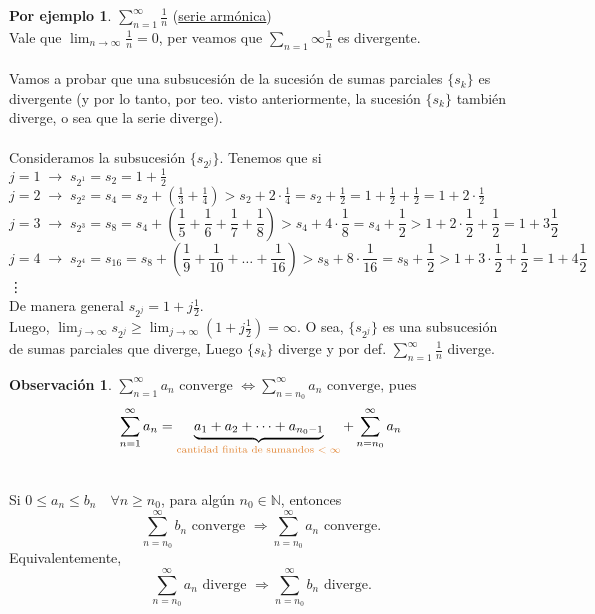 \documentclass{article}
\theoremstyle{definition}
\newtheorem*{obs}{Observación}
\newtheorem*{ej}{Por ejemplo}
\theoremstyle{remark}
\begin{document}
\begin{ej}
  $\sum_{n=1}^{\infty}{\frac{1}{n}}$ \quad \big(\underline{serie armónica}\big) \\
Vale que $\lim_{n\to\infty}{\frac{1}{n}}=0$, per veamos que $\sum_{n=1}{\infty}{\frac{1}{n}}$ es divergente. \\\\
Vamos a probar que una subsucesión de la sucesión de sumas parciales $\{s_k\}$ es divergente (y por lo tanto, por teo. visto anteriormente, la sucesión $\{s_k\}$ también diverge, o sea que la serie diverge). \\\\
Consideramos la subsucesión $\{s_{2^j}\}$. Tenemos que si \\
$j=1 \; \longrightarrow \; s_{2^1}=s_2=1+\frac{1}{2}$ \\
$j=2 \; \longrightarrow \; s_{2^2}=s_4=s_2+\left(\frac{1}{3}+\frac{1}{4}\right)>s_2+2\cdot \frac{1}{4}=s_2+\frac{1}{2}=1+\frac{1}{2}+\frac{1}{2}=1+2\cdot\frac{1}{2}$ \\
$$j=3\;  \longrightarrow \; s_{2^3}=s_8=s_4+\left(\frac{1}{5}+\frac{1}{6}+\frac{1}{7}+\frac{1}{8}\right)>s_4+4\cdot\frac{1}{8}=s_4+\frac{1}{2}>1+2\cdot\frac{1}{2}+\frac{1}{2}=1+3\frac{1}{2}$$
$$j=4\;\longrightarrow \; s_{2^4}=s_{16}=s_8+\left(\frac{1}{9}+\frac{1}{10}+\dots+\frac{1}{16}\right)>s_8+8\cdot\frac{1}{16}=s_8+\frac{1}{2}>1+3\cdot\frac{1}{2}+\frac{1}{2}=1+4\frac{1}{2}$$ \vdots \\
De manera general $s_{2^j}=1+j\frac{1}{2}$.\\
Luego, $\lim_{j \to \infty}{s_{2^j}} \geq \lim_{j \to \infty} \left(1+j\frac{1}{2}\right)=\infty$. O sea, $\{s_{2^j}\}$ es una subsucesión  de sumas parciales que diverge, Luego $\{s_k\}$ diverge y por def. $\sum_{n=1}^{\infty}{\frac{1}{n}}$ diverge.
\end{ej}

\begin{obs}
  $\sum_{n=1}^{\infty}{a_n} \text{ converge } \Longleftrightarrow \sum_{n=n_0}^{\infty}{a_n} \text{ converge, pues}$ $$
  \sum_{n=1}^{\infty}{a_n}=\underbrace{a_1+a_2+\dots+a_{n_0-1}}_{\textcolor{rojop2}{\text{cantidad finita de sumandos } <\; \infty}}+\sum_{n=n_0}^{\infty}{a_n}
  $$
\end{obs}

\begin{teo} \; \\
  Si $0 \leq a_n \leq b_n \quad \forall n \geq n_0$, para algún $n_0 \in \mathbb{N}$, entonces $$\sum_{n=n_0}^{\infty}{b_n}\text{ converge }\Rightarrow \sum_{n=n_0}^{\infty}{a_n} \text{ converge.}$$
  Equivalentemente,$$
  \sum_{n=n_0}^{\infty}a_n \text{ diverge } \Rightarrow \sum_{n=n_0}^{\infty}{b_n} \text{ diverge}
  .$$
\end{teo}
\end{document}
